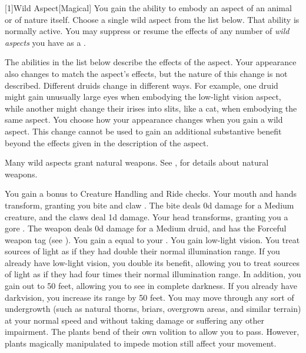         [1]{Wild Aspect}[Magical]
        You gain the ability to embody an aspect of an animal or of nature itself.
        Choose a single wild aspect from the list below.
        That ability is normally active.
        You may suppress or resume the effects of any number of \textit{wild aspects} you have as a .

        The abilities in the list below describe the effects of the aspect.
        Your appearance also changes to match the aspect's effects, but the nature of this change is not described.
        Different druids change in different ways.
        For example, one druid might gain unusually large eyes when embodying the low-light vision aspect, while another might change their irises into slits, like a cat, when embodying the same aspect.
        You choose how your appearance changes when you gain a wild aspect.
        This change cannot be used to gain an additional substantive benefit beyond the effects given in the description of the aspect.

        Many wild aspects grant natural weapons.
        See , for details about natural weapons.

        {
            You gain a  bonus to Creature Handling and Ride checks.
            Your mouth and hands transform, granting you bite and claw .
            The bite deals \plus0d damage for a Medium creature, and the claws deal \minus1d damage.
            Your head transforms, granting you a gore .
            The weapon deals \plus0d damage for a Medium druid, and has the Forceful weapon tag (see ).
            You gain a  equal to your .
            You gain low-light vision.
            You treat sources of light as if they had double their normal illumination range.
            If you already have low-light vision, you double its benefit, allowing you to treat sources of light as if they had four times their normal illumination range.
            In addition, you gain  out to 50 feet, allowing you to see in complete darkness.
            If you already have darkvision, you increase its range by 50 feet.
            You may move through any sort of undergrowth (such as natural thorns, briars, overgrown areas, and similar terrain) at your normal speed and without taking damage or suffering any other impairment.
            The plants bend of their own volition to allow you to pass.
            However, plants magically manipulated to impede motion still affect your movement.
        }

